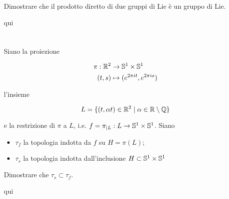 \section{}\label{es3-1}

\begin{tcolorbox}
	Dimostrare che il prodotto diretto di due gruppi di Lie è un gruppo di Lie.
\end{tcolorbox}

qui

%

\newpage

%

\section{}\label{es3-2}

\begin{tcolorbox}
	Siano la proiezione
	
	\begin{align}
		\begin{split}
			\pi : \R^{2} &\to \S^{1} \times \S^{1}\\
			(t,s) &\mapsto (e^{2 \pi i t},e^{2 \pi i s})
		\end{split}
	\end{align}

	l'insieme
	
	\begin{equation}
		L = \{ (t,\alpha t) \in \R^{2} \mid \alpha \in \R \setminus \Q \}
	\end{equation}

	e la restrizione di $ \pi $ a $ L $, i.e. $ f = \pi_{|L} : L \to \S^{1} \times \S^{1} $. Siano
	
	\begin{itemize}
		\item $ \tau_{f} $ la topologia indotta da $ f $ su $ H = \pi(L) $;
		
		\item $ \tau_{s} $ la topologia indotta dall'inclusione $ H \subset \S^{1} \times \S^{1} $
	\end{itemize}

	Dimostrare che $ \tau_{s} \subset \tau_{f} $.
\end{tcolorbox}

qui

%

\newpage

%

\section{}\label{es3-3}

